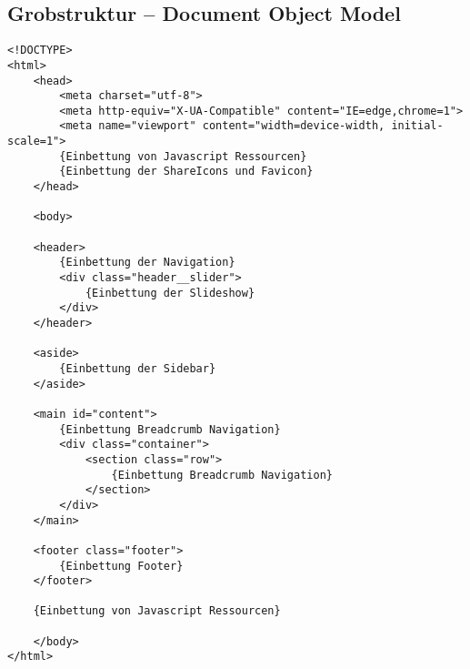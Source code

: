 \subsection{Grobstruktur -- Document Object Model}
\label{listing:DOM}
\begin{lstlisting}[style=htmlcssjs, backgroundcolor = \color{lightgray},
caption=DOM der index.php] 
<!DOCTYPE>
<html> 
	<head>
	    <meta charset="utf-8">
	    <meta http-equiv="X-UA-Compatible" content="IE=edge,chrome=1">
	    <meta name="viewport" content="width=device-width, initial-scale=1">
	    {Einbettung von Javascript Ressourcen}
	    {Einbettung der ShareIcons und Favicon}
	</head>
	
	<body>
	
	<header>
	    {Einbettung der Navigation}
	    <div class="header__slider">
	        {Einbettung der Slideshow}
	    </div>
	</header>
	
	<aside>
	    {Einbettung der Sidebar}
	</aside>
	
	<main id="content">
	    {Einbettung Breadcrumb Navigation}
	    <div class="container">
	        <section class="row">
	            {Einbettung Breadcrumb Navigation}
	        </section>
	    </div>
	</main>
	
	<footer class="footer">
	    {Einbettung Footer}
	</footer>
	
	{Einbettung von Javascript Ressourcen}
	
	</body>	
</html>
\end{lstlisting}
\clearpage